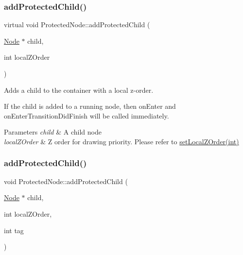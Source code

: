 \subsubsection{\texorpdfstring{add\+Protected\+Child()}{addProtectedChild()}\hspace{0.1cm}{\footnotesize\ttfamily [4/6]}}
{\footnotesize\ttfamily virtual void Protected\+Node\+::add\+Protected\+Child (\begin{DoxyParamCaption}\item[{\hyperlink{classNode}{Node} $\ast$}]{child,  }\item[{int}]{local\+Z\+Order }\end{DoxyParamCaption})\hspace{0.3cm}{\ttfamily [virtual]}}

Adds a child to the container with a local z-\/order.

If the child is added to a \textquotesingle{}running\textquotesingle{} node, then \textquotesingle{}on\+Enter\textquotesingle{} and \textquotesingle{}on\+Enter\+Transition\+Did\+Finish\textquotesingle{} will be called immediately.


\begin{DoxyParams}{Parameters}
{\em child} & A child node \\
\hline
{\em local\+Z\+Order} & Z order for drawing priority. Please refer to {\ttfamily \hyperlink{classNode_aee4e616c2d55b722226aae1e68b4946f}{set\+Local\+Z\+Order(int)}} \\
\hline
\end{DoxyParams}
\mbox{\label{classProtectedNode_a5fa7088c0b7baa650d62537a85e1c134}} 
\subsubsection{\texorpdfstring{add\+Protected\+Child()}{addProtectedChild()}\hspace{0.1cm}{\footnotesize\ttfamily [5/6]}}
{\footnotesize\ttfamily void Protected\+Node\+::add\+Protected\+Child (\begin{DoxyParamCaption}\item[{\hyperlink{classNode}{Node} $\ast$}]{child,  }\item[{int}]{local\+Z\+Order,  }\item[{int}]{tag }\end{DoxyParamCaption})\hspace{0.3cm}{\ttfamily [virtual]}}

